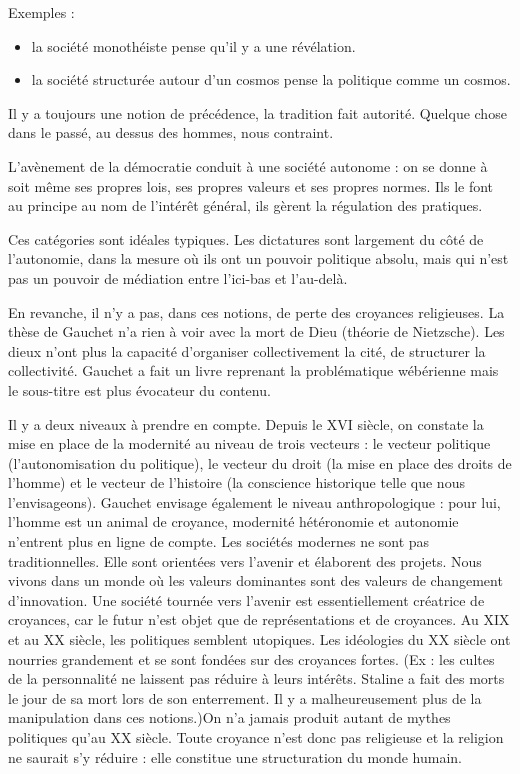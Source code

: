 \documentclass[a4paper,11pt]{article}
\begin{document}
	Exemples :
	\begin{itemize}
	\item la société monothéiste pense qu’il y a une révélation.
	\item la société structurée autour d’un cosmos pense la politique comme un cosmos.
	\end{itemize}
	
	Il y a toujours une notion de précédence, la tradition fait autorité. Quelque chose dans le passé, au dessus des hommes, nous contraint.
	
	L’avènement de la démocratie conduit à une société autonome : on se donne à soit même ses propres lois, ses propres valeurs et ses propres normes. Ils le font au principe au nom de l’intérêt général, ils gèrent la régulation des pratiques.
	
	Ces catégories sont idéales typiques. Les dictatures sont largement du côté de l’autonomie, dans la mesure où ils ont un pouvoir politique absolu, mais qui n’est pas un pouvoir de médiation entre l’ici-bas et l’au-delà.
	
	En revanche, il n’y a pas, dans ces notions, de perte des croyances religieuses. La thèse de Gauchet n’a rien à voir avec la mort de Dieu (théorie de Nietzsche).
	Les dieux n’ont plus la capacité d’organiser collectivement la cité, de structurer la collectivité.
	Gauchet a fait un livre reprenant la problématique wébérienne mais le sous-titre est plus évocateur du contenu. 

	Il y a deux niveaux à prendre en compte.
	Depuis le XVI siècle, on constate la mise en place de la modernité au niveau de trois vecteurs : le vecteur politique (l’autonomisation du politique), le vecteur du droit (la mise en place des droits de l’homme) et le vecteur de l’histoire (la conscience historique telle que nous l’envisageons).
	Gauchet envisage également le niveau anthropologique : pour lui, l’homme est un animal de croyance, modernité hétéronomie et autonomie n’entrent plus en ligne de compte. Les sociétés modernes ne sont pas traditionnelles.
	Elle sont orientées vers l’avenir et élaborent des projets.
	Nous vivons dans un monde où les valeurs dominantes sont des valeurs de changement d’innovation.
	Une société tournée vers l’avenir est essentiellement créatrice de croyances, car le futur n’est objet que de représentations et de croyances.
	Au XIX et au XX siècle, les politiques semblent utopiques. Les idéologies du XX siècle ont nourries grandement et se sont fondées sur des croyances fortes. (Ex : les cultes de la personnalité ne laissent pas réduire à leurs intérêts. Staline a fait des morts le jour de sa mort lors de son enterrement.
	Il y a malheureusement plus de la manipulation dans ces notions.)On n’a jamais produit autant de mythes politiques qu’au XX siècle.
	Toute croyance n’est donc pas religieuse et la religion ne saurait s’y réduire : elle constitue une structuration du monde humain.\\
	
\end{document}
